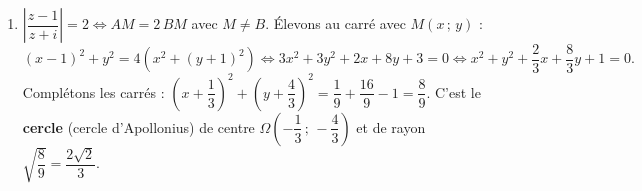 \documentclass[11pt]{article}
\begin{document}
\begin{corrige}
\begin{enumerate}
\begin{enumerate}
La condition $\arg\left(\dfrac{z - 1}{z + i}\right) = \dfrac{\pi}{3}\;[\pi]$ équivaut donc à $\left(\overrightarrow{MB}, \overrightarrow{MA}\right) = \dfrac{\pi}{3}\;[\pi]$, c'est-à-dire à une mesure de l'angle \textbf{de droites} $\left((MB), (MA)\right)$ égale à $\dfrac{\pi}{3}\;[\pi]$.
\item L'ensemble des points $M$ d'où l'on voit le segment $[AB]$ sous un angle de droites égal à $\dfrac{\pi}{3}\;[\pi]$ est la réunion de deux \textbf{arcs de cercle} d'extrémités $A$ et $B$ (arcs capables), symétriques par rapport à la droite $(AB)$, \textbf{privés des points $A$ et $B$}.

Déterminons les cercles supports. La corde $[AB]$ a pour longueur $AB = \sqrt{2}$ ; pour un angle inscrit de $\dfrac{\pi}{3}$, la relation $AB = 2R\sin\dfrac{\pi}{3}$ donne :
\[ R = \frac{\sqrt{2}}{2 \times \frac{\sqrt{3}}{2}} = \frac{\sqrt{2}}{\sqrt{3}} = \frac{\sqrt{6}}{3}. \]
Le centre $\Omega$ est sur la médiatrice de $[AB]$. Comme $A(1\,;\,0)$ et $B(0\,;\,1)$, le milieu est $I\left(\dfrac{1}{2}\,;\,\dfrac{1}{2}\right)$ et la médiatrice est la droite d'équation $y = x$. La distance du centre au milieu vaut :
\[ d = R\cos\frac{\pi}{3} = \frac{\sqrt{6}}{3} \times \frac{1}{2} = \frac{\sqrt{6}}{6}. \]
Un vecteur unitaire directeur de la médiatrice est $\dfrac{1}{\sqrt{2}}(1\,;\,1)$, donc les deux centres sont $I \pm \dfrac{d}{\sqrt{2}}(1\,;\,1)$ avec $\dfrac{d}{\sqrt{2}} = \dfrac{\sqrt{6}}{6\sqrt{2}} = \dfrac{\sqrt{3}}{6}$ :
\[ \Omega_1\left(\frac{1}{2} - \frac{\sqrt{3}}{6}\,;\,\frac{1}{2} - \frac{\sqrt{3}}{6}\right) \quad \text{et} \quad \Omega_2\left(\frac{1}{2} + \frac{\sqrt{3}}{6}\,;\,\frac{1}{2} + \frac{\sqrt{3}}{6}\right). \]
$\Gamma$ est la réunion des deux arcs d'extrémités $A$ et $B$ portés par ces cercles, \textbf{points $A$ et $B$ exclus} (le quotient n'est pas défini en $B$, et l'argument n'a pas de sens en $A$).
\item Construction : tracer les deux cercles de centres $\Omega_1$, $\Omega_2$ et de rayon $\dfrac{\sqrt{6}}{3} \approx 0{,}82$ (soit environ 1,6 cm à l'échelle 2 cm), et ne retenir que les arcs d'extrémités $A$ et $B$ (voir figure).
\end{enumerate}
\item $\left|\dfrac{z - 1}{z + i}\right| = 2 \iff AM = 2\,BM$ avec $M \neq B$. Élevons au carré avec $M(x\,;\,y)$ :
\[ (x-1)^2 + y^2 = 4\left(x^2 + (y+1)^2\right) \iff 3x^2 + 3y^2 + 2x + 8y + 3 = 0 \iff x^2 + y^2 + \frac{2}{3}x + \frac{8}{3}y + 1 = 0. \]
Complétons les carrés : $\left(x + \dfrac{1}{3}\right)^2 + \left(y + \dfrac{4}{3}\right)^2 = \dfrac{1}{9} + \dfrac{16}{9} - 1 = \dfrac{8}{9}$. C'est le \textbf{cercle} (cercle d'Apollonius) de centre $\Omega\left(-\dfrac{1}{3}\,;\,-\dfrac{4}{3}\right)$ et de rayon $\sqrt{\dfrac{8}{9}} = \dfrac{2\sqrt{2}}{3}$.
\end{enumerate}
\end{corrige}
\end{document}
